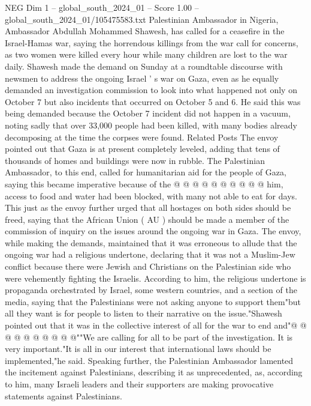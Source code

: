 \begin{textsample}{NEG Dim 1 – global\_south\_2024\_01 – Score 1.00 – global\_south\_2024\_01/105475583.txt}  \label{ex:f1_neg_354}
Palestinian Ambassador in Nigeria, Ambassador Abdullah Mohammed Shawesh, has called for a ceasefire in the Israel-Hamas war, saying the horrendous killings from the war call for concerns, as two women were killed every hour while many children are lost to the war daily.
Shawesh made the demand on Sunday at a roundtable discourse with newsmen to address the ongoing Israel ' s war on Gaza, even as he equally demanded an investigation commission to look into what happened not only on October 7 but also incidents that occurred on October 5 and 6.
He said this was being demanded because the October 7 incident did not happen in a vacuum, noting sadly that over 33,000 people had been killed, with many bodies already decomposing at the time the corpses were found.
Related Posts The envoy pointed out that Gaza is at present completely leveled, adding that tens of thousands of homes and buildings were now in rubble.
The Palestinian Ambassador, to this end, called for humanitarian aid for the people of Gaza, saying this became imperative because of the @ @ @ @ @ @ @ @ @ @ him, access to food and water had been blocked, with many not able to eat for days.
This just as the envoy further urged that all hostages on both sides should be freed, saying that the African Union ( AU ) should be made a member of the commission of inquiry on the issues around the ongoing war in Gaza.
The envoy, while making the demands, maintained that it was erroneous to allude that the ongoing war had a religious undertone, declaring that it was not a Muslim-Jew conflict because there were Jewish and Christians on the Palestinian side who were vehemently fighting the Israelis.
According to him, the religious undertone is propaganda orchestrated by Israel, some western countries, and a section of the media, saying that the Palestinians were not asking anyone to support them"but all they want is for people to listen to their narrative on the issue."Shawesh pointed out that it was in the collective interest of all for the war to end and"@ @ @ @ @ @ @ @ @ @""We are calling for all to be part of the investigation.
It is very important."It is all in our interest that international laws should be implemented,"he said.
Speaking further, the Palestinian Ambassador lamented the incitement against Palestinians, describing it as unprecedented, as, according to him, many Israeli leaders and their supporters are making provocative statements against Palestinians.

\end{textsample}
